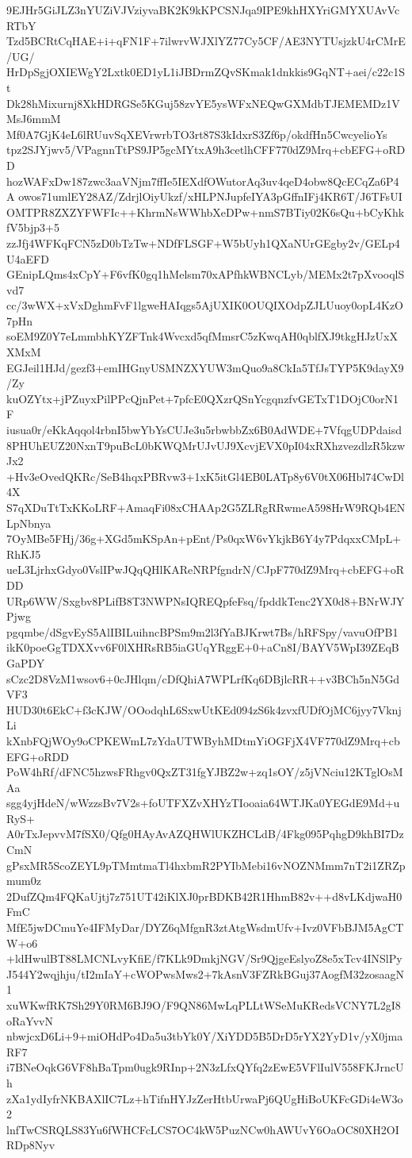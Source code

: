 9EJHr5GiJLZ3nYUZiVJVziyvaBK2K9kKPCSNJqa9IPE9khHXYriGMYXUAvVcRTbY
Tzd5BCRtCqHAE+i+qFN1F+7ilwrvWJXlYZ77Cy5CF/AE3NYTUsjzkU4rCMrE/UG/
HrDpSgjOXIEWgY2Lxtk0ED1yL1iJBDrmZQvSKmak1dnkkis9GqNT+aei/c22c1St
Dk28hMixurnj8XkHDRGSe5KGuj58zvYE5ysWFxNEQwGXMdbTJEMEMDz1VMsJ6mmM
Mf0A7GjK4eL6lRUuvSqXEVrwrbTO3rt87S3kIdxrS3Zf6p/okdfHn5CwcyelioYs
tpz2SJYjwv5/VPagnnTtPS9JP5gcMYtxA9h3cetlhCFF770dZ9Mrq+cbEFG+oRDD
hozWAFxDw187zwc3aaVNjm7ffIe5IEXdfOWutorAq3uv4qeD4obw8QcECqZa6P4A
owos71umlEY28AZ/ZdrjlOiyUkzf/xHLPNJupfeIYA3pGffnIFj4KR6T/J6TFsUI
OMTPR8ZXZYFWFIc++KhrmNsWWhbXeDPw+nmS7BTiy02K6sQu+bCyKhkfV5bjp3+5
zzJfj4WFKqFCN5zD0bTzTw+NDfFLSGF+W5bUyh1QXaNUrGEgby2v/GELp4U4aEFD
GEnipLQms4xCpY+F6vfK0gq1hMelsm70xAPfhkWBNCLyb/MEMx2t7pXvooqlSvd7
cc/3wWX+xVxDghmFvF1lgweHAIqgs5AjUXIK0OUQIXOdpZJLUuoy0opL4KzO7pHn
soEM9Z0Y7eLmmbhKYZFTnk4Wvcxd5qfMmsrC5zKwqAH0qblfXJ9tkgHJzUxXXMxM
EGJeil1HJd/gezf3+emIHGnyUSMNZXYUW3mQuo9a8CkIa5TfJsTYP5K9dayX9/Zy
kuOZYtx+jPZuyxPilPPcQjnPet+7pfcE0QXzrQSnYcgqnzfvGETxT1DOjC0orN1F
iusua0r/eKkAqqol4rbnI5bwYbYsCUJe3u5rbwbbZx6B0AdWDE+7VfqgUDPdaisd
8PHUhEUZ20NxnT9puBcL0bKWQMrUJvUJ9XcvjEVX0pI04xRXhzvezdlzR5kzwJx2
+Hv3eOvedQKRc/SeB4hqxPBRvw3+1xK5itGl4EB0LATp8y6V0tX06Hbl74CwDl4X
S7qXDuTtTxKKoLRF+AmaqFi08xCHAAp2G5ZLRgRRwmeA598HrW9RQb4ENLpNbnya
7OyMBe5FHj/36g+XGd5mKSpAn+pEnt/Ps0qxW6vYkjkB6Y4y7PdqxxCMpL+RhKJ5
ueL3LjrhxGdyo0VslIPwJQqQHlKAReNRPfgndrN/CJpF770dZ9Mrq+cbEFG+oRDD
URp6WW/Sxgbv8PLifB8T3NWPNsIQREQpfeFsq/fpddkTenc2YX0d8+BNrWJYPjwg
pgqmbe/dSgvEyS5AlIBILuihncBPSm9m2l3fYaBJKrwt7Bs/hRFSpy/vavuOfPB1
ikK0poeGgTDXXvv6F0lXHRsRB5iaGUqYRggE+0+aCn8I/BAYV5WpI39ZEqBGaPDY
sCzc2D8VzM1wsov6+0cJHlqm/cDfQhiA7WPLrfKq6DBjlcRR++v3BCh5nN5GdVF3
HUD30t6EkC+f3cKJW/OOodqhL6SxwUtKEd094zS6k4zvxfUDfOjMC6jyy7VknjLi
kXnbFQjWOy9oCPKEWmL7zYdaUTWByhMDtmYiOGFjX4VF770dZ9Mrq+cbEFG+oRDD
PoW4hRf/dFNC5hzwsFRhgv0QxZT31fgYJBZ2w+zq1sOY/z5jVNciu12KTglOsMAa
sgg4yjHdeN/wWzzsBv7V2s+foUTFXZvXHYzTIooaia64WTJKa0YEGdE9Md+uRyS+
A0rTxJepvvM7fSX0/Qfg0HAyAvAZQHWlUKZHCLdB/4Fkg095PqhgD9khBI7DzCmN
gPsxMR5ScoZEYL9pTMmtmaTl4hxbmR2PYIbMebi16vNOZNMmm7nT2i1ZRZpmum0z
2DufZQm4FQKaUjtj7z751UT42iKlXJ0prBDKB42R1HhmB82v++d8vLKdjwaH0FmC
MfE5jwDCmuYe4IFMyDar/DYZ6qMfgnR3ztAtgWsdmUfv+Ivz0VFbBJM5AgCTW+o6
+ldHwulBT88LMCNLvyKfiE/f7KLk9DmkjNGV/Sr9QjgeEslyoZ8e5xTcv4INSlPy
J544Y2wqjhju/tI2mIaY+cWOPwsMws2+7kAsnV3FZRkBGuj37AogfM32zosaagN1
xuWKwfRK7Sh29Y0RM6BJ9O/F9QN86MwLqPLLtWSeMuKRedsVCNY7L2gI8oRaYvvN
nbwjcxD6Li+9+miOHdPo4Da5u3tbYk0Y/XiYDD5B5DrD5rYX2YyD1v/yX0jmaRF7
i7BNeOqkG6VF8hBaTpm0ugk9RInp+2N3zLfxQYfq2zEwE5VFlIulV558FKJrncUh
zXa1ydIyfrNKBAXlIC7Lz+hTifnHYJzZerHtbUrwaPj6QUgHiBoUKFcGDi4eW3o2
lnfTwCSRQLS83Yu6fWHCFcLCS7OC4kW5PuzNCw0hAWUvY6OaOC80XH2OIRDp8Nyv
